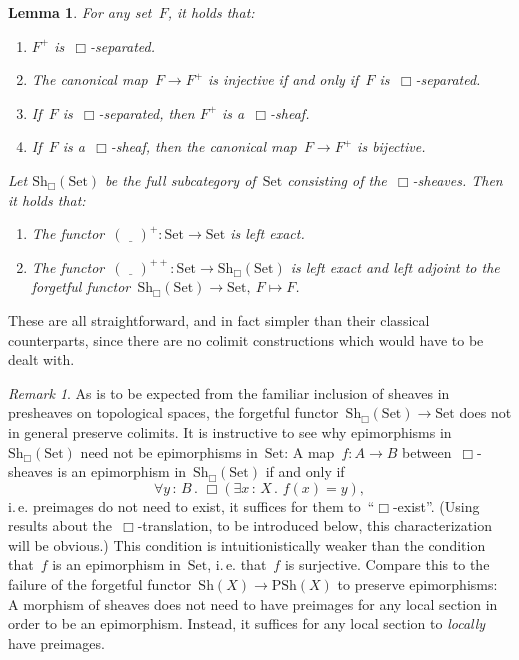 \documentclass[10pt,reqno,a4paper]{amsbook}
\makeatletter
\theoremstyle{definition}
\theoremstyle{plain}
\newtheorem{lemma}[defn]{Lemma}
\theoremstyle{remark}
\newtheorem{rem}[defn]{Remark}
\newcommand{\placeholder}{\underline{\quad}}
\newcommand{\Set}{\mathrm{Set}}
\newcommand{\Sh}{\mathrm{Sh}}
\newcommand{\PSh}{\mathrm{PSh}}
\newcommand{\?}{\,{:}\,}
\renewcommand{\_}{\mathpunct{.}\,}
\newcommand{\ie}{i.\,e.\@\xspace}
\renewenvironment{proof}[1][\proofname]{\par
  \pushQED{\qed}%
  \normalfont \topsep6\p@\@plus6\p@\relax
  \trivlist
  \item[\hskip\labelsep
        \itshape
    #1\@addpunct{.}]\ignorespaces
}{%
  \popQED\endtrivlist\@endpefalse
}
\makeatother
\begin{document}
\begin{lemma}For any set~$F$, it holds that: \begin{enumerate}
\item $F^+$ is~$\Box$-separated.
\item The canonical map~$F \to F^+$ is injective if and only if~$F$
is~$\Box$-separated.
\item If~$F$ is~$\Box$-separated, then $F^+$ is a~$\Box$-sheaf.
\item If~$F$ is a~$\Box$-sheaf, then the canonical map~$F \to F^+$ is bijective.
\end{enumerate}
Let $\Sh_\Box(\Set)$ be the full subcategory of~$\Set$ consisting of
the~$\Box$-sheaves. Then it holds that:
\begin{enumerate}
\addtocounter{enumi}{4}
\item The functor~$(\placeholder)^+ : \Set \to \Set$ is left exact.
\item The functor~$(\placeholder)^{++} : \Set \to \Sh_\Box(\Set)$ is left exact and left
adjoint to the forgetful functor~$\Sh_\Box(\Set) \to \Set,\ F \mapsto F$.
\end{enumerate}\end{lemma}
\begin{proof}These are all straightforward, and in fact simpler than their
classical counterparts, since there are no colimit constructions which would have to
be dealt with.
\end{proof}

\begin{rem}\label{rem:epi-in-box-sheaves}
As is to be expected from the familiar inclusion of sheaves in
presheaves on topological spaces, the forgetful functor~$\Sh_\Box(\Set) \to \Set$
does not in general preserve colimits. It is instructive to see why
epimorphisms in~$\Sh_\Box(\Set)$ need not be epimorphisms in~$\Set$: A map~$f:A
\to B$ between~$\Box$-sheaves is an epimorphism in~$\Sh_\Box(\Set)$ if and only
if
\[ \forall y\?B\_ \Box(\exists x\?X\_ f(x) = y), \]
\ie preimages do not need to exist, it suffices for them to~``$\Box$-exist''.
(Using results about the~$\Box$-translation, to be introduced below, this
characterization will be obvious.) This condition is intuitionistically weaker
than the condition that~$f$ is an epimorphism in~$\Set$, \ie that~$f$ is
surjective. Compare this to the failure of the forgetful functor~$\Sh(X)
\to \PSh(X)$ to preserve epimorphisms: A morphism of sheaves does not need to
have preimages for any local section in order to be an epimorphism. Instead, it
suffices for any local section to \emph{locally} have preimages.\end{rem}
\end{document}
